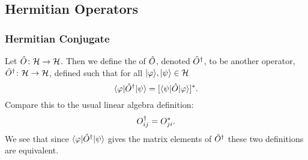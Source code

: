     \subsection{Hermitian Operators}
    \subsubsection{Hermitian Conjugate}
    Let \(\hat{O}\colon\mathcal{H}\to\mathcal{H}\).
    Then we define the  of \(\hat{O}\), denoted \(\hat{O}^\dagger\), to be another operator, \(\hat{O}^\dagger\colon\mathcal{H}\to\mathcal{H}\), defined such that for all \(\vert {\varphi} \rangle, \vert {\psi} \rangle\in\mathcal{H}\)
    \[\langle {\varphi} \vert\hat{O}^\dagger\vert {\psi} \rangle = [\langle {\psi} \vert\hat{O}\vert {\varphi} \rangle]^*.\]
    Compare this to the usual linear algebra definition:
    \[O_{ij}^\dagger = O_{ji}^*.\]
    We see that since \(\langle {\varphi} \vert\hat{O}^\dagger\vert {\psi} \rangle\) gives the matrix elements of \(\hat{O}^\dagger\) these two definitions are equivalent.
    
